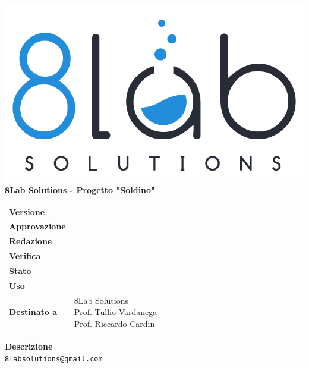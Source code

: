 \thispagestyle{empty}
\begin{titlepage}
	\begin{center}
		\includegraphics[scale = 0.3]{res/images/logo8_crop.png}\\
		\large \textbf{8Lab Solutions - Progetto "Soldino"} \\
		\vfill
		\Huge \textbf{\doctitle}
		\vspace*{\fill}
        
        \vfill
        \large
    \end{center}
	\begin{table}[htbp]
        \centering
        \hspace*{2cm}
        \begin{tabular}{l|l}
            \textbf{Versione} & \rev{} \\
            \textbf{Approvazione} & \approv{} \\
            \textbf{Redazione} & \red{} \\
            \textbf{Verifica} & \ver{} \\
            \textbf{Stato} & \stato{} \\
            \textbf{Uso} & \uso{} \\
            \textbf{Destinato a} & \parbox[t]{5cm}{8Lab Solutions
            \\Prof. Tullio Vardanega\\Prof. Riccardo Cardin}
        \end{tabular}
    \end{table}
    \begin{center}
        \vfill
        \normalsize
        \textbf{Descrizione}\\
		\describedoc
        \vfill
        \small
        \texttt{8labsolutions@gmail.com}
	\end{center}
\end{titlepage}
